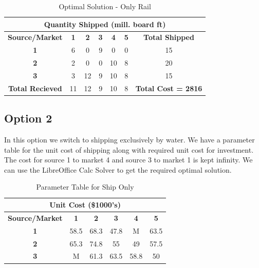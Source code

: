 \documentclass[12pt]{article}
\numberwithin{equation}{section}
\numberwithin{table}{section}
\numberwithin{figure}{section}
\begin{document}
\begin{table}[h!]
\centering
\caption{Optimal Solution - Only Rail}
\label{optimal_rail}
\begin{tabular}{|c|c|c|c|c|c|c}
\hline
\multicolumn{7}{|c|}{\textbf{Quantity Shipped (mill. board ft)}}                                                                       \\ \hline
\textbf{Source/Market}  & \textbf{1} & \textbf{2} & \textbf{3} & \textbf{4} & \textbf{5} & \multicolumn{1}{c|}{\textbf{Total Shipped}} \\ \hline
\textbf{1}              & 6          & 0          & 9          & 0          & 0          & \multicolumn{1}{c|}{15}                     \\ \hline
\textbf{2}              & 2          & 0          & 0          & 10         & 8          & \multicolumn{1}{c|}{20}                     \\ \hline
\textbf{3}              & 3          & 12         & 9          & 10         & 8          & \multicolumn{1}{c|}{15}                     \\ \hline
\textbf{Total Recieved} & 11         & 12         & 9          & 10         & 8          & \textbf{Total Cost = 2816}                  \\ \cline{1-6}
\end{tabular}
\end{table}

\subsection{Option 2}
In this option we switch to shipping exclusively by water. We have a parameter table for the unit cost of shipping along with required unit cost for investment. The cost for source 1 to market 4 and source 3 to market 1 is kept infinity. We can use the LibreOffice Calc Solver to get the required optimal solution.

\begin{table}[h!]
\centering
\caption{Parameter Table for Ship Only}
\label{param_ship}
\begin{tabular}{|c|c|c|c|c|c|}
\hline
\multicolumn{6}{|c|}{\textbf{Unit Cost (\$1000's)}}                                     \\ \hline
\textbf{Source/Market} & \textbf{1} & \textbf{2} & \textbf{3} & \textbf{4} & \textbf{5} \\ \hline
\textbf{1}             & 58.5       & 68.3       & 47.8       & M          & 63.5       \\ \hline
\textbf{2}             & 65.3       & 74.8       & 55         & 49         & 57.5       \\ \hline
\textbf{3}             & M          & 61.3       & 63.5       & 58.8       & 50         \\ \hline
\end{tabular}
\end{table}
\end{document}
